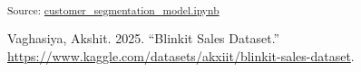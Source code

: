 \documentclass[
  letterpaper,
  DIV=11,
  numbers=noendperiod]{scrartcl}
\newlength{\cslhangindent}
\newenvironment{CSLReferences}[2] %
 {\begin{list}{}{%
  \setlength{\itemindent}{0pt}
  \setlength{\leftmargin}{0pt}
  \setlength{\parsep}{0pt}
  \ifodd #1
   \setlength{\leftmargin}{\cslhangindent}
   \setlength{\itemindent}{-1\cslhangindent}
  \fi
  \setlength{\itemsep}{#2\baselineskip}}}
 {\end{list}}
\begin{document}
\textsubscript{Source:
\href{https://plot-masters.github.io/customer-segmentation/notebook/customer_segmentation_model-preview.html\#cell-0}{customer\_segmentation\_model.ipynb}}

\label{refs}
\begin{CSLReferences}{1}{0}
Vaghasiya, Akshit. 2025. {``Blinkit {Sales} {Dataset}.''}
\url{https://www.kaggle.com/datasets/akxiit/blinkit-sales-dataset}.

\end{CSLReferences}
\end{document}
